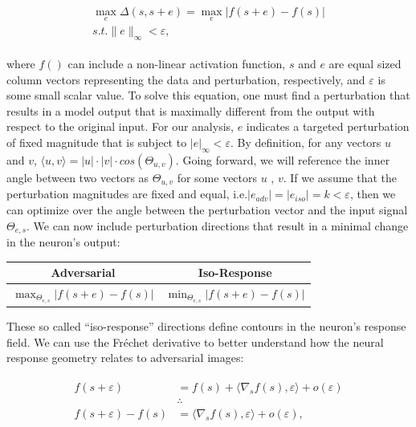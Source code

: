 \begin{align}\label{eq:ch4_adv_metric}
\begin{split}
    \max_{e} \Delta (s, s+e) = \max_{e} |f(s+e) - f(s)| \\
    s.t. \|e\|_{\infty} < \varepsilon,
\end{split}
\end{align}

where $f()$ can include a non-linear activation function, $s$ and $e$ are equal sized column vectors representing the data and perturbation, respectively, and $\varepsilon$ is some small scalar value. To solve this equation, one must find a perturbation that results in a model output that is maximally different from the output with respect to the original input. For our analysis, $e$ indicates a targeted perturbation of fixed magnitude that is subject to $|e|_{\infty}<\varepsilon$. By definition, for any vectors $u$ and $v$, $\langle u,v\rangle = |u| \cdot |v| \cdot cos(\Theta_{u,v})$. Going forward, we will reference the inner angle between two vectors as $\Theta_{u,v}$ for some vectors $u$ , $v$. If we assume that the perturbation magnitudes are fixed and equal, i.e.$|e_{adv}| = |e_{iso}| = k < \varepsilon$, then we can optimize over the angle between the perturbation vector and the input signal $\Theta_{e,s}$. We can now include perturbation directions that result in a minimal change in the neuron's output:

\begin{center}
    \begin{tabular}{ |c | c| } \hline
     \textbf{Adversarial} & \textbf{Iso-Response} \\ \hline
     $\max_{\Theta_{e,s}}|f(s+e) - f(s)|$ & $\min_{\Theta_{e,s}} | f(s+e) - f(s) |$ \\ \hline
    \end{tabular}
\end{center}

These so called ``iso-response'' directions define contours in the neuron's response field. We can use the Fr\'{e}chet derivative to better understand how the neural response geometry relates to adversarial images:

\begin{align}\label{eq:ch4_frechet}
\begin{split}
    f(s+\varepsilon) &= f(s) + \langle\nabla_{s}f(s), \varepsilon\rangle + o(\varepsilon)\\
    &\therefore \\
    f(s+\varepsilon) - f(s) &= \langle\nabla_{s}f(s), \varepsilon\rangle+ o(\varepsilon),
\end{split}
\end{align}


